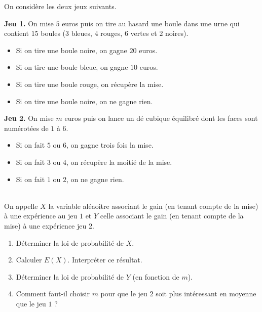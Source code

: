 \documentclass[11pt]{article}
\begin{document}
\begin{exo}
  On considère les deux jeux suivants.\\
  \begin{minipage}[t]{.55\textwidth}
    \textbf{Jeu 1.} On mise $5$ euros puis on tire au hasard une boule dans une
    urne qui contient $15$ boules ($3$ bleues, $4$ rouges, $6$ vertes et $2$
    noires).
    \begin{itemize}
      \item Si on tire une boule noire, on gagne $20$ euros.
      \item Si on tire une boule bleue, on gagne $10$ euros.
      \item Si on tire une boule rouge, on récupère la mise.
      \item Si on tire une boule noire, on ne gagne rien.
    \end{itemize}
  \end{minipage}
  \hfill
  \begin{minipage}[t]{.4\textwidth}
    \textbf{Jeu 2.} On mise $m$ euros puis on lance un dé cubique équilibré dont
    les faces sont numérotées de $1$ à $6$.
    \begin{itemize}
      \item Si on fait $5$ ou $6$, on gagne trois fois la mise.
      \item Si on fait $3$ ou $4$, on récupère la moitié de la mise.
      \item Si on fait $1$ ou $2$, on ne gagne rien.
    \end{itemize}
  \end{minipage}\\
  On appelle $X$ la variable aléaoitre associant le gain (en tenant compte de la
  mise) à une expérience au jeu $1$ et $Y$ celle associant le gain (en tenant
  compte de la mise) à une expérience jeu $2$.
  \begin{enumerate}
    \item Déterminer la loi de probabilité de $X$.
    \item Calculer $E(X)$. Interpréter ce résultat.
    \item Déterminer la loi de probabilité de $Y$ (en fonction de $m$).
    \item Comment faut-il choisir $m$ pour que le jeu $2$ soit plus intéressant
      en moyenne que le jeu $1$ ?
  \end{enumerate}
\end{exo}
\end{document}
